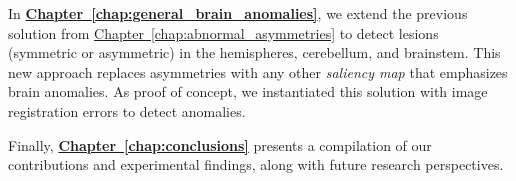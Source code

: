 In \textbf{\hyperref[chap:general_brain_anomalies]{Chapter~\ref{chap:general_brain_anomalies}}}, we extend the previous solution from \hyperref[chap:abnormal_asymmetries]{Chapter~\ref{chap:abnormal_asymmetries}} to detect lesions (symmetric or asymmetric) in the hemispheres, cerebellum, and brainstem. This new approach replaces asymmetries with any other \emph{saliency map} that emphasizes brain anomalies. As proof of concept, we instantiated this solution with image registration errors to detect anomalies.

Finally, \textbf{\hyperref[chap:conclusions]{Chapter~\ref{chap:conclusions}}} presents a compilation of our contributions and experimental findings, along with future research perspectives.

